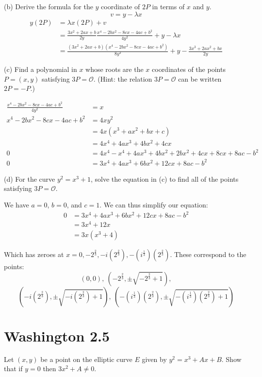 \documentclass{article}
\begin{document}
(b) Derive the formula for the $y$ coordinate of $2P$ in terms of $x$ and $y$.
$$v = y - \lambda x$$
\begin{align*}
y(2P) &= \lambda x(2P) + v \\
&= \frac{3x^2 + 2ax + b}{2y}\frac{x^4 - 2bx^2 - 8cx - 4ac + b^2}{4y^2} + y - \lambda x \\
&= \frac{(3x^2 + 2ax + b)(x^4 - 2bx^2 - 8cx - 4ac + b^2)}{8y^3} + y - \frac{3x^3 + 2ax^2 + bx}{2y}
\end{align*}

(c) Find a polynomial in $x$ whose roots are the $x$ coordinates of the points $P=(x,y)$ satisfying $3P=\mathcal{O}$. (Hint: the relation $3P = \mathcal{O}$ can be written $2P = -P$.)

\begin{align*}
\frac{x^4 - 2bx^2 - 8cx - 4ac + b^2}{4y^2} &= x \\
x^4 - 2bx^2 - 8cx - 4ac + b^2 &= 4xy^2 \\
&= 4x(x^3 + ax^2 + bx + c) \\
&= 4x^4 + 4ax^3 + 4bx^2 + 4cx \\
0 &= 4x^4 - x^4 + 4ax^3 + 4bx^2 + 2bx^2 + 4cx + 8cx + 8ac - b^2 \\
0 &= 3x^4 + 4ax^3 + 6bx^2 + 12cx + 8ac - b^2
\end{align*}

(d) For the curve $y^2 = x^3 + 1$, solve the equation in (c) to find all of the points satisfying $3P = \mathcal{O}$.

We have $a = 0$, $b = 0$, and $c = 1$. We can thus simplify our equation:
\begin{align*}
0 &= 3x^4 + 4ax^3 + 6bx^2 + 12cx + 8ac - b^2 \\
&= 3x^4 + 12x \\
&= 3x(x^3 + 4)
\end{align*}

Which has zeroes at $x = 0,-2^\frac{2}{3},-i(2^\frac{2}{3}),-(i^\frac{1}{3})(2^\frac{2}{3})$. These correspond to the points:
$$(0, 0),~\left(-2^\frac{2}{3}, \pm \sqrt{-2^\frac{2}{3} + 1}\right),$$
$$\left(-i(2^\frac{2}{3}), \pm \sqrt{-i(2^\frac{2}{3}) + 1}\right),~\left(-(i^\frac{1}{3})(2^\frac{2}{3}), \pm \sqrt{-(i^\frac{1}{3})(2^\frac{2}{3}) + 1}\right)$$

\section{Washington 2.5}
Let $(x,y)$ be a point on the elliptic curve $E$ given by $y^2 = x^3 + Ax + B$. Show that if $y = 0$ then $3x^2 + A \neq 0$. 
\end{document}
